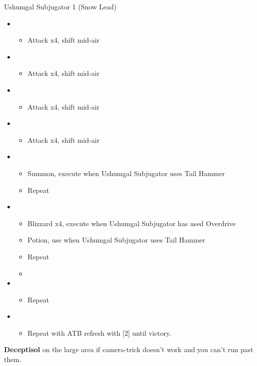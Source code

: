 	\begin{battle}[1:23]{Ushumgal Subjugator 1 (Snow Lead)}
		\begin{itemize}
			\item \first
			      \begin{itemize}
				      \item Attack x4, shift mid-air
			      \end{itemize}
			\item \second
			      \begin{itemize}
				      \item Attack x4, shift mid-air
			      \end{itemize}
			\item \first
			      \begin{itemize}
				      \item Attack x4, shift mid-air
			      \end{itemize}
			\item \second
			      \begin{itemize}
				      \item Attack x4, shift mid-air
			      \end{itemize}
			\item \first
			      \begin{itemize}
				      \item Summon, execute when Ushumgal Subjugator uses Tail Hammer
				      \item Repeat
			      \end{itemize}
			\item \fifth
			      \begin{itemize}
				      \item Blizzard x4, execute when Ushumgal Subjugator has used Overdrive
				      \item Potion, use when Ushumgal Subjugator uses Tail Hammer
				      \item Repeat
				      \item \stagger
			      \end{itemize}
			\item \sixth
			      \begin{itemize}
				      \item Repeat
			      \end{itemize}
			\item \first
			      \begin{itemize}
				      \item Repeat with ATB refresh with [2] until victory.
			      \end{itemize}
		\end{itemize}
	\end{battle}
	\textbf{Deceptisol} on the large area if camera-trick doesn't work and you can't run past them.

